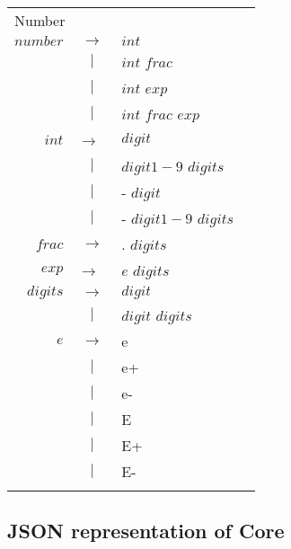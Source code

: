 \documentclass{article}
\begin{document}
\begin{footnotesize}
\begin{longtable}{ r c l r }
\multicolumn{4}{l}{Number}		\\
$number$	& $ \rightarrow $ 	& $int$ 				& \\
		& $ | $			& $int$ $frac$				& \\
		& $ | $			& $int$ $exp$				& \\
		& $ | $			& $int$ $frac$ $exp$			& \\
$int$		& $ \rightarrow$ 	& $digit$				& \\
		& $ | $ 		& $digit1-9$ $digits$			& \\
		& $ | $ 		& - $digit$				& \\
		& $ | $ 		& - $digit1-9$ $digits$			& \\
$frac$ 		& $ \rightarrow $ 	& . $digits$ 				& \\
$exp$		& $ \rightarrow $ 	& $e$ $digits$ 				& \\
$digits$	& $ \rightarrow $ 	& $digit$				& \\
		& $ | $ 		& $digit$ $digits$			& \\
$e$		& $ \rightarrow $ 	& e					& \\
		& $ | $ 		& e+					& \\
		& $ | $ 		& e- 					& \\
		& $ | $ 		& E					& \\
		& $ | $ 		& E+					& \\
		& $ | $ 		& E-					& \\
\\[0.01in]

\end{longtable}

\end{footnotesize}

\subsection{JSON representation of Core}

\end{document}
